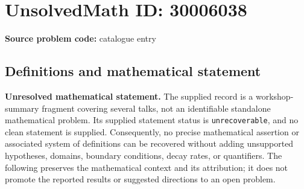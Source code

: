 \documentclass[11pt]{article}
\begin{document}
\section*{UnsolvedMath ID: 30006038}
\textbf{Source problem code:} catalogue entry
\subsection{Definitions and mathematical statement}
\textbf{Unresolved mathematical statement.} The supplied record is a workshop-summary fragment covering several talks, not an identifiable standalone mathematical problem. Its supplied statement status is \texttt{unrecoverable}, and no clean statement is supplied. Consequently, no precise mathematical assertion or associated system of definitions can be recovered without adding unsupported hypotheses, domains, boundary conditions, decay rates, or quantifiers. The following preserves the mathematical context and its attribution; it does not promote the reported results or suggested directions to an open problem.
\end{document}
